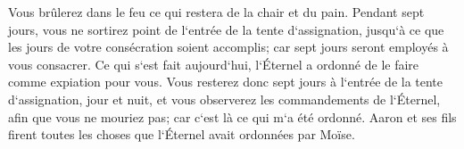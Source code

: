 \verse Vous brûlerez dans le feu ce qui restera de la chair et du pain. 
\verse Pendant sept jours, vous ne sortirez point de l`entrée de la tente d`assignation, jusqu`à ce que les jours de votre consécration soient accomplis; car sept jours seront employés à vous consacrer. 
\verse Ce qui s`est fait aujourd`hui, l`Éternel a ordonné de le faire comme expiation pour vous. 
\verse Vous resterez donc sept jours à l`entrée de la tente d`assignation, jour et nuit, et vous observerez les commandements de l`Éternel, afin que vous ne mouriez pas; car c`est là ce qui m`a été ordonné. 
\verse Aaron et ses fils firent toutes les choses que l`Éternel avait ordonnées par Moïse. 

\chapter{}

